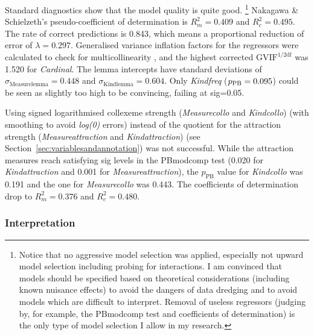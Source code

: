 Standard diagnostics show that the model quality is quite good.%
\footnote{Notice that no aggressive model selection was applied, especially not upward model selection including probing for interactions.
I am convinced that models should be specified based on theoretical considerations (including known nuisance effects) to avoid the dangers of data dredging and to avoid models which are difficult to interpret.
Removal of useless regressors (judging by, for example, the PBmodcomp test and coefficients of determination) is the only type of model selection I allow in my research.}
Nakagawa \& Schielzeth's pseudo-coefficient of determination is $R_m^2=0.409$ and $R^2_c=0.495$.
The rate of correct predictions is 0.843, which means a proportional reduction of error of $\lambda=0.297$.
Generalised variance inflation factors for the regressors were calculated to check for multicollinearity \citep{FoxMonette1992,ZuurEa2010}, and the highest corrected $\text{GVIF}^{1/2\text{df}}$ was 1.520 for \textit{Cardinal}.
The lemma intercepts have standard deviations of $\sigma_{\text{Measurelemma}}=0.448$ and $\sigma_{\text{Kindlemma}}=0.604$.
Only \textit{Kindfreq} ($p_{\text{PB}}=0.095$) could be seen as slightly too high to be convincing, failing at sig=0.05.

Using signed logarithmised collexeme strength (\textit{Measurecollo} and \textit{Kindcollo}) (with smoothing to avoid \textit{log(0)} errors) instead of the quotient for the attraction strength (\textit{Measureattraction} and \textit{Kindattraction}) (see Section~\ref{sec:variablesandannotation}) was not successful.
While the attraction measures reach satisfying sig levels in the PBmodcomp test (0.020 for \textit{Kindattraction} and 0.001 for \textit{Measureattraction}), the $p_{\text{PB}}$ value for \textit{Kindcollo} was 0.191 and the one for \textit{Measurecollo} was 0.443.
The coefficients of determination drop to $R_m^2=0.376$ and $R^2_c=0.480$.

\subsubsection{Interpretation}
\label{sec:mainstudyinterpretation}

